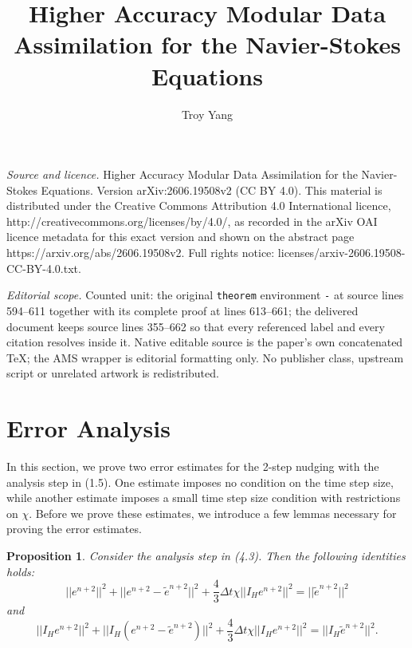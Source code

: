 \documentclass[10pt,a4paper]{amsart}
\newtheorem{proposition}[theorem]{Proposition}
\begin{document}
\title[Higher Accuracy Modular Data Assimilation for the Navier-Sto]{Higher Accuracy Modular Data Assimilation for the Navier-Stokes Equations}
\author{Troy Yang}
\date{}
\maketitle
\noindent\emph{Source and licence.} Higher Accuracy Modular Data Assimilation for the Navier-Stokes Equations. Version arXiv:2606.19508v2 (CC BY 4.0). This material is distributed under the Creative Commons Attribution 4.0 International licence, http://creativecommons.org/licenses/by/4.0/, as recorded in the arXiv OAI licence metadata for this exact version and shown on the abstract page https://arxiv.org/abs/2606.19508v2. Full rights notice: licenses/arxiv-2606.19508-CC-BY-4.0.txt.\par\smallskip
\noindent\textit{Editorial scope.} Counted unit: the original \texttt{theorem} environment \texttt{-} at source lines 594--611 together with its complete proof at lines 613--661; the delivered document keeps source lines 355--662 so that every referenced label and every citation resolves inside it. Native editable source is the paper's own concatenated TeX; the AMS wrapper is editorial formatting only. No publisher class, upstream script or unrelated artwork is redistributed.
\section{Error Analysis}
In this section, we prove two error estimates for the 2-step nudging with the analysis step in (1.5). One estimate imposes no condition on the time step size, while another estimate imposes a small time step size condition with restrictions on $\chi$. Before we prove these estimates, we introduce a few lemmas necessary for proving the error estimates.


\begin{proposition}
    Consider the analysis step in (4.3). Then the following identities holds:
    \begin{equation}
        ||e^{n+2}||^2+||e^{n+2}-\tilde{e}^{n+2}||^2+\frac{4}{3}\Delta t\chi ||I_He^{n+2}||^2= ||\tilde{e}^{n+2}||^2
    \end{equation}
    and
    \begin{equation}
        ||I_He^{n+2}||^2+||I_H(e^{n+2}-\tilde{e}^{n+2})||^2+\frac{4}{3}\Delta t\chi ||I_He^{n+2}||^2= ||I_H\tilde{e}^{n+2}||^2.
    \end{equation}
\end{proposition}
\end{document}
